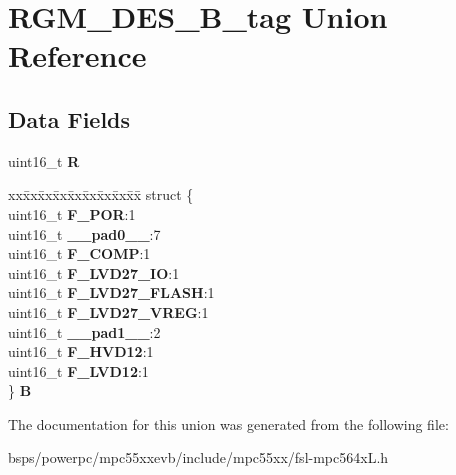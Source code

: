\hypertarget{unionRGM__DES__16B__tag}{}\section{R\+G\+M\+\_\+\+D\+E\+S\+\_\+B\+\_\+tag Union Reference}
\label{unionRGM__DES__16B__tag}
\subsection*{Data Fields}
\begin{DoxyCompactItemize}
\item 
\mbox{\label{unionRGM__DES__16B__tag_a1dcbd00fa9359a4563b1b51ff0167014}} 
uint16\+\_\+t {\bfseries R}
\item 
\mbox{\label{unionRGM__DES__16B__tag_a89c7394629273fb8387e93f8a2d0c138}} 
\begin{tabbing}
xx\=xx\=xx\=xx\=xx\=xx\=xx\=xx\=xx\=\kill
struct \{\\
\>uint16\_t {\bfseries F\_POR}:1\\
\>uint16\_t {\bfseries \_\_pad0\_\_}:7\\
\>uint16\_t {\bfseries F\_COMP}:1\\
\>uint16\_t {\bfseries F\_LVD27\_IO}:1\\
\>uint16\_t {\bfseries F\_LVD27\_FLASH}:1\\
\>uint16\_t {\bfseries F\_LVD27\_VREG}:1\\
\>uint16\_t {\bfseries \_\_pad1\_\_}:2\\
\>uint16\_t {\bfseries F\_HVD12}:1\\
\>uint16\_t {\bfseries F\_LVD12}:1\\
\} {\bfseries B}\\

\end{tabbing}\end{DoxyCompactItemize}


The documentation for this union was generated from the following file\+:\begin{DoxyCompactItemize}
\item 
bsps/powerpc/mpc55xxevb/include/mpc55xx/fsl-\/mpc564x\+L.\+h\end{DoxyCompactItemize}

